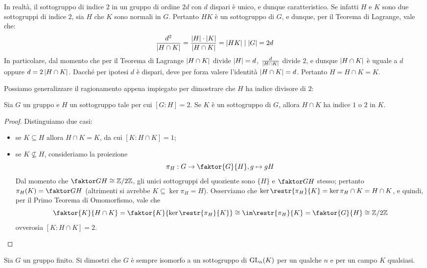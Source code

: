 \documentclass[11pt]{scrartcl}
\begin{document}
	\begin{remark}
		In realtà, il sottogruppo di indice $2$ in un gruppo di ordine $2d$ con
		$d$ dispari è
		unico, e dunque caratteristico. Se infatti $H$ e $K$ sono due sottogruppi
		di indice $2$, sia $H$ che $K$ sono normali in $G$. Pertanto
		$HK$ è un sottogruppo di $G$, e dunque, per il Teorema di Lagrange,
		vale che:
		\[ \frac{d^2}{\left\lvert H \cap K \right\rvert} = \frac{\left\lvert H \right\rvert \cdot \left\lvert K \right\rvert}{\left\lvert H \cap K \right\rvert} = \left\lvert HK \right\rvert \mid \left\lvert G \right\rvert = 2d \]
		In particolare, dal momento che per il Teorema di Lagrange $\left\lvert H \cap K \right\rvert$ divide
		$\left\lvert H \right\rvert = d$, $\frac{d}{\left\lvert H \cap K \right\rvert}$ divide $2$, e dunque
		$\left\lvert H \cap K \right\rvert$ è uguale a $d$ oppure $d = 2 \left\lvert H \cap K \right\rvert$. 
		Dacché per ipotesi $d$ è dispari, deve per forza valere l'identità
		$\left\lvert H \cap K \right\rvert = d$. Pertanto $H = H \cap K = K$.
	\end{remark}
	
	Possiamo generalizzare il ragionamento appena impiegato per dimostrare
	che $H$ ha indice divisore di $2$:
	
	\begin{proposition}
		\label{prop1.49}
		Sia $G$ un gruppo e $H$ un sottogruppo tale per cui $[G:H] = 2$. Se
		$K$ è un sottogruppo di $G$, allora $H\cap K$ ha indice $1$ o $2$ in $K$.
	\end{proposition}
	
	\begin{proof}
		Distinguiamo due casi:
		\begin{itemize}
			\item se $K \subseteq H$ allora $H \cap K = K$, da cui $[K:H\cap K] = 1$;
			\item se $K \nsubseteq H$, consideriamo la proiezione 
			\[
			\pi_H: G \to \faktor{G}{H}, g \mapsto gH
			\]
			Dal momento che $\faktor G H \cong \Z2$, gli unici sottogruppi 
			del quoziente sono $\{H\}$ e $\faktor G H$ stesso; pertanto 
			$\pi_H(K) = \faktor G H$ (altrimenti si avrebbe $K \subseteq \ker \pi_H = H$). Osserviamo che $\ker \restr{\pi_{H}}{K}
			= \ker \pi_H \cap K = H \cap K$, e quindi, per il Primo Teorema di Omomorfismo,
			vale che 
			\[ \faktor{K}{H\cap K} = \faktor{K}{\ker \restr{\pi_{H}}{K}} \cong \im \restr{\pi_{H}}{K} = \faktor{G}{H} \cong \Z2 \]
			ovverosia $[K:H\cap K] = 2$.
		\end{itemize}
	\end{proof}
	
	\begin{exercise}[$\star$]
		Sia $G$ un gruppo finito. Si dimostri che $G$ è sempre isomorfo a
		un sottogruppo di $\operatorname{GL}_n(K)$ per un qualche $n$ e per un campo
		$K$ qualsiasi.
	\end{exercise}
	
\end{document}

